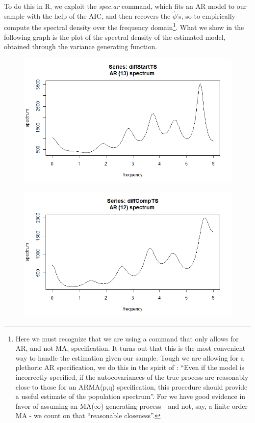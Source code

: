 \documentclass[12pt]{article} %
\begin{document}
To do this in R, we exploit the \emph{spec.ar} command, which fits an AR model to our sample with the help of the AIC, and then recovers the $\hat{\phi}$'s, so to empirically compute the spectral density over the frequency domain\footnote{Here we must recognize that we are using a command that only allows for AR, and not MA, specification. It turns out that this is the most convenient way to handle the estimation given our sample. Tough we are allowing for a plethoric AR specification, we do this in the spirit of \citet[p.165]{hammy}: ``Even if the model is incorrectly specified, if the autocovariances of the true process are reasonably close to those for an ARMA(p,q) specification, this procedure should provide a useful estimate of the population spectrum''. For we have good evidence in favor of assuming an MA($\infty$) generating process - and not, say, a finite order MA -  we count on that ``reasonable closeness''.}. What we show in the following graph is the plot of the spectral density of the estimated model, obtained through the variance generating function.

\begin{figure}[H]
\begin{center}
\includegraphics[scale=0.55]{specarstart}
\caption{}
\end{center}
\end{figure}

\begin{figure}[H]
\begin{center}
\includegraphics[scale=0.55]{specarcomp}
\caption{}
\end{center}
\end{figure}
\end{document}

